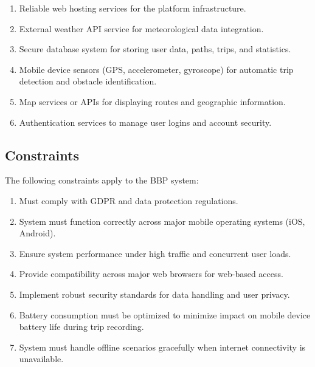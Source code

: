 \begin{enumerate}
    \item Reliable web hosting services for the platform infrastructure.
    \item External weather API service for meteorological data integration.
    \item Secure database system for storing user data, paths, trips, and statistics.
    \item Mobile device sensors (GPS, accelerometer, gyroscope) for automatic trip detection and obstacle identification.
    \item Map services or APIs for displaying routes and geographic information.
    \item Authentication services to manage user logins and account security.
\end{enumerate}

\subsection{Constraints}
\label{subsec:constraints}%

The following constraints apply to the BBP system:

\begin{enumerate}
    \item Must comply with GDPR and data protection regulations.
    \item System must function correctly across major mobile operating systems (iOS, Android).
    \item Ensure system performance under high traffic and concurrent user loads.
    \item Provide compatibility across major web browsers for web-based access.
    \item Implement robust security standards for data handling and user privacy.
    \item Battery consumption must be optimized to minimize impact on mobile device battery life during trip recording.
    \item System must handle offline scenarios gracefully when internet connectivity is unavailable.
\end{enumerate}
